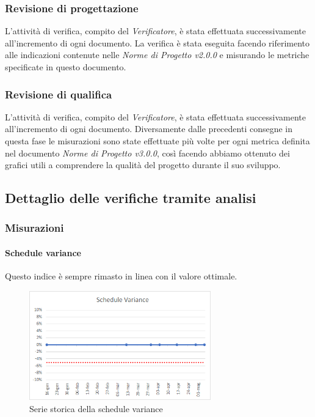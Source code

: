 	\subsubsection{Revisione di progettazione}
	L'attività di verifica, compito del \emph{Verificatore}, è stata effettuata successivamente all'incremento di ogni documento. La verifica è stata eseguita facendo riferimento alle indicazioni contenute nelle \emph{Norme di Progetto v2.0.0} e misurando le metriche specificate in questo documento.
	\subsubsection{Revisione di qualifica}
	L'attività di verifica, compito  del \emph{Verificatore}, è stata effettuata successivamente all'incremento di ogni documento.
	Diversamente dalle precedenti consegne in questa fase le misurazioni sono state effettuate più volte per ogni metrica definita nel documento \emph{Norme di Progetto v3.0.0}, così facendo abbiamo ottenuto dei grafici utili a comprendere la qualità del progetto durante il suo sviluppo.
	
	\subsection{Dettaglio delle verifiche tramite analisi}
	\label{AdR_Dettaglio}
	\subsubsection{Misurazioni}
	\label{misure}
	\paragraph{Schedule variance} \Spazio
	Questo indice è sempre rimasto in linea con il valore ottimale.
	\begin{figure}[H]
		\centering 
		\includegraphics[width=0.7\textwidth]{Images/SV.png}
		\caption{Serie storica della schedule variance}
		\label{SV} 
	\end{figure}
